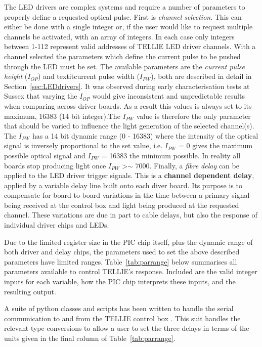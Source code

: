 \documentclass[12pt]{report}
\begin{document}
The LED drivers are complex systems and require a number of parameters to properly define a requested optical pulse. First is \textit{channel selection}. This can either be done with a single integer or, if the user would like to request multiple channels be activated, with an array of integers. In each case only integers between 1-112 represent valid addresses of TELLIE LED driver channels. With a channel selected the parameters which define the current pulse to be pushed through the LED must be set. The available parameters are the \textit{current pulse height} ($I_{OP}$) and textit{current pulse width} ($I_{PW}$), both are described in detail in Section~\ref{sec:LEDdrivers}. It was observed during early characterisation tests at Sussex that varying the $I_{OP}$ would give inconsistent and unpredictable results when comparing across driver boards. As a result this values is always set to its maximum, 16383 (14 bit integer).The $I_{PW}$ value is therefore the only parameter that should be varied to influence the light generation of the selected channel(s). The $I_{PW}$ has a 14 bit dynamic range (0 - 16383) where the intensity of the optical signal is inversely proportional to the set value, i.e. $I_{PW}$ = 0 gives the maximum possible optical signal and $I_{PW}$ = 16383 the minimum possible. In reality all boards stop producing light once $I_{PW}$ \textgreater$\sim$ 7000. Finally, a \textit{fibre delay} can be applied to the LED driver trigger signals. This is a \textbf{channel dependent delay}, applied by a variable delay line built onto each diver board. Its purpose is to compensate for board-to-board variations in the time between a primary signal being received at the control box and light being produced at the requested channel. These variations are due in part to cable delays, but also the response of individual driver chips and LEDs. 

Due to the limited register size in the PIC chip itself, plus the dynamic range of both driver and delay chips, the parameters used to set the above described parameters have limited ranges. Table~\ref{tab:parrange} below summarises all parameters available to control TELLIE's response. Included are the valid integer inputs for each variable, how the PIC chip interprets these inputs, and the resulting output.  

A suite of python classes and scripts has been written to handle the serial communication to and from the TELLIE control box \cite{tellieCode}. This suit handles the relevant type conversions to allow a user to set the three delays in terms of the units given in the final column of Table~\ref{tab:parrange}.
\end{document}
